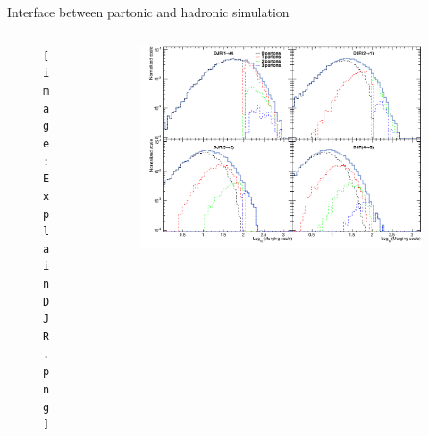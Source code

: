 \begin{frame}{Interface between partonic and hadronic simulation}
\vspace{-.2cm}
\begin{columns}
\begin{column}{.30\textwidth}
\begin{figure}[!Hhtbp]
  \begin{center}
    \texttt{[image: ExplainDJR.png]}
  \end{center}
\end{figure}
\end{column}
\begin{column}{.70\textwidth}
\begin{figure}[!Hhtbp]
  \begin{center}
    \includegraphics[width=1.0\textwidth]{../figs/DJR_q100_xq20_TTJets13TeV.png}
  \end{center}
\end{figure}
\end{column}
\end{columns}


%


\end{frame}
